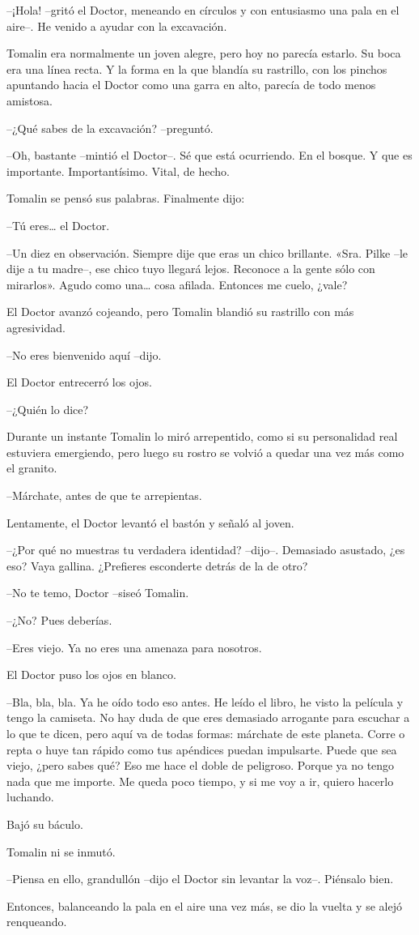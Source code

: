--¡Hola! --gritó el Doctor, meneando en círculos y con entusiasmo una pala en el aire--. He venido a ayudar con la excavación.

Tomalin era normalmente un joven alegre, pero hoy no parecía estarlo. Su boca era una línea recta. Y la forma en la que blandía su rastrillo, con los pinchos apuntando hacia el Doctor como una garra en alto, parecía de todo menos amistosa.

--¿Qué sabes de la excavación? --preguntó.

--Oh, bastante --mintió el Doctor--. Sé que está ocurriendo. En el bosque. Y que es importante. Importantísimo. Vital, de hecho.

Tomalin se pensó sus palabras. Finalmente dijo:

--Tú eres… el Doctor.

--Un diez en observación. Siempre dije que eras un chico brillante. «Sra. Pilke --le dije a tu madre--, ese chico tuyo llegará lejos. Reconoce a la gente sólo con mirarlos». Agudo como una… cosa afilada. Entonces me cuelo, ¿vale?

El Doctor avanzó cojeando, pero Tomalin blandió su rastrillo con más agresividad.

--No eres bienvenido aquí --dijo.

El Doctor entrecerró los ojos.

--¿Quién lo dice?

Durante un instante Tomalin lo miró arrepentido, como si su personalidad real estuviera emergiendo, pero luego su rostro se volvió a quedar una vez más como el granito.

--Márchate, antes de que te arrepientas.

Lentamente, el Doctor levantó el bastón y señaló al joven.

--¿Por qué no muestras tu verdadera identidad? --dijo--. Demasiado asustado, ¿es eso? Vaya gallina. ¿Prefieres esconderte detrás de la de otro?

--No te temo, Doctor --siseó Tomalin.

--¿No? Pues deberías.

--Eres viejo. Ya no eres una amenaza para nosotros.

El Doctor puso los ojos en blanco.

--Bla, bla, bla. Ya he oído todo eso antes. He leído el libro, he visto la película y tengo la camiseta. No hay duda de que eres demasiado arrogante para escuchar a lo que te dicen, pero aquí va de todas formas: márchate de este planeta. Corre o repta o huye tan rápido como tus apéndices puedan impulsarte. Puede que sea viejo, ¿pero sabes qué? Eso me hace el doble de peligroso. Porque ya no tengo nada que me importe. Me queda poco tiempo, y si me voy a ir, quiero hacerlo luchando.

Bajó su báculo.

Tomalin ni se inmutó.

--Piensa en ello, grandullón --dijo el Doctor sin levantar la voz--. Piénsalo bien.

Entonces, balanceando la pala en el aire una vez más, se dio la vuelta y se alejó renqueando.


